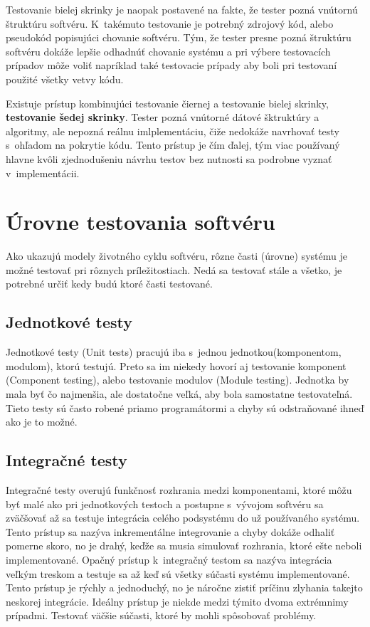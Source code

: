 Testovanie bielej skrinky je naopak postavené na fakte, že tester pozná vnútornú štruktúru softvéru.
K~takémuto testovanie je potrebný zdrojový kód, alebo pseudokód popisujúci chovanie softvéru.
Tým, že tester presne pozná štruktúru softvéru dokáže lepšie odhadnúť chovanie systému a pri výbere testovacích prípadov môže voliť napríklad také testovacie prípady aby boli pri testovaní použité všetky vetvy kódu.

Existuje prístup kombinujúci testovanie čiernej a testovanie bielej skrinky, \textbf{testovanie šedej skrinky}.
Tester pozná vnútorné dátové šktruktúry a algoritmy, ale nepozná reálnu imlplementáciu, čiže nedokáže navrhovať testy s~ohľadom na pokrytie kódu.
Tento prístup je čím ďalej, tým viac používaný hlavne kvôli zjednodušeniu návrhu testov bez nutnosti sa podrobne vyznať v~implementácii.

\section{Úrovne testovania softvéru}
\label{testing_levels}
Ako ukazujú modely životného cyklu softvéru, rôzne časti (úrovne) systému je možné testovať pri rôznych príležitostiach. 
Nedá sa testovať stále a všetko, je potrebné určiť kedy budú ktoré časti testované.

\subsection{Jednotkové testy}
\label{unit_tests}
Jednotkové testy (Unit tests) pracujú iba s~jednou jednotkou(komponentom, modulom), ktorú testujú.
Preto sa im niekedy hovorí aj testovanie komponent (Component testing), alebo testovanie modulov (Module testing).
Jednotka by mala byť čo najmenšia, ale dostatočne veľká, aby bola samostatne testovateľná.
Tieto testy sú často robené priamo programátormi a chyby sú odstraňované ihneď ako je to možné.

\subsection{Integračné testy}
\label{integration_tests}
Integračné testy overujú funkčnosť rozhrania medzi komponentami, ktoré môžu byť malé ako pri jednotkových testoch a postupne s~vývojom softvéru sa zväčšovať až sa testuje integrácia celého podsystému do už používaného systému.
Tento prístup sa nazýva inkrementálne integrovanie a chyby dokáže odhaliť pomerne skoro, no je drahý, keďže sa musia simulovať rozhrania, ktoré ešte neboli implementované.
Opačný prístup k~integračný testom sa nazýva integrácia veľkým treskom a testuje sa až keď sú všetky súčasti systému implementované.
Tento prístup je rýchly a jednoduchý, no je náročne zistiť príčinu zlyhania takejto neskorej integrácie.
Ideálny prístup je niekde medzi týmito dvoma extrémnimy prípadmi.
Testovať väčšie súčasti, ktoré by mohli spôsobovať problémy.

